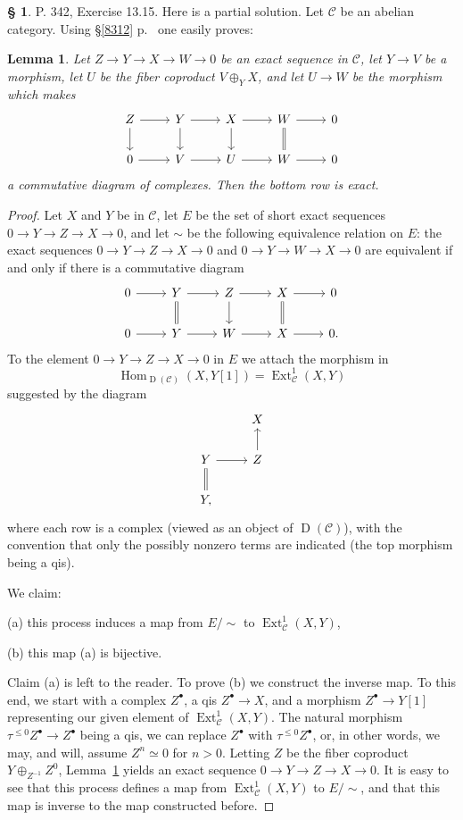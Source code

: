 \documentclass[12pt]{article}
\newtheorem{lem}[thm]{Lemma}
\theoremstyle{remark}
\theoremstyle{definition}
\newtheorem{s}[thm]{\S}
\newcommand{\C}{\mathcal C}
\newcommand{\oo}{\operatorname}
\DeclareMathOperator{\Hom}{Hom}%
\begin{document}
\begin{s} 
P. 342, Exercise 13.15. Here is a partial solution. Let $\C$ be an abelian category. Using \S\ref{8312} p.~\pageref{8312} one easily proves:

\begin{lem}\label{738}
Let $Z\to Y\to X\to W\to0$ be an exact sequence in $\C$, let $Y\to V$ be a morphism, let $U$ be the fiber coproduct $V\oplus_YX$, and let $U\to W$ be the morphism which makes 
$$
\begin{tikzcd}
Z\ar{d}\ar{r}&Y\ar{d}\ar{r}&X\ar{d}\ar{r}&W\ar[equal]{d}\ar{r}&0\\ 
0\ar{r}&V\ar{r}&U\ar{r}&W\ar{r}&0
\end{tikzcd}
$$ 
a commutative diagram of complexes. Then the bottom row is exact.
\end{lem}
%
\begin{proof}
Let $X$ and $Y$ be in $\C$, let $E$ be the set of short exact sequences $0\to Y\to Z\to X\to0$, and let $\sim$ be the following equivalence relation on $E$: the exact sequences $0\to Y\to Z\to X\to0$ and $0\to Y\to W\to X\to0$ are equivalent if and only if there is a commutative diagram 
$$
\begin{tikzcd}
0\ar{r}&Y\ar[equal]{d}\ar{r}&Z\ar{d}\ar{r}&X\ar[equal]{d}\ar{r}&0\\ 
0\ar{r}&Y\ar{r}&W\ar{r}&X\ar{r}&0.
\end{tikzcd}
$$ 
To the element $0\to Y\to Z\to X\to0$ in $E$ we attach the morphism in 
$$
\Hom_{\oo D(\C)}(X,Y[1])=\oo{Ext}^1_\C(X,Y)
$$ 
suggested by the diagram 
$$
\begin{tikzcd}
{}&X\\ 
Y\ar[equal]{d}\ar{r}&Z\ar{u}\\ 
Y,
\end{tikzcd}
$$ 
where each row is a complex (viewed as an object of $\oo D(\C)$), with the convention that only the possibly nonzero terms are indicated (the top morphism being a qis). 

We claim: 

(a) this process induces a map from $E/\!\!\sim$ to $\oo{Ext}^1_\C(X,Y)$, 

(b) this map (a) is bijective. 

Claim (a) is left to the reader. To prove (b) we construct the inverse map. To this end, we start with a complex $Z^\bullet$, a qis $Z^\bullet\to X$, and a morphism $Z^\bullet\to Y[1]$ representing our given element of $\oo{Ext}^1_\C(X,Y)$. The natural morphism $\tau^{\le0}Z^\bullet\to Z^\bullet$ being a qis, we can replace $Z^\bullet$ with $\tau^{\le0}Z^\bullet$, or, in other words, we may, and will, assume $Z^n\simeq0$ for $n>0$. Letting $Z$ be the fiber coproduct $Y\oplus_{Z^{-1}}Z^0$, Lemma~\ref{738} yields an exact sequence $0\to Y\to Z\to X\to0$. It is easy to see that this process defines a map from $\oo{Ext}^1_\C(X,Y)$ to $E/\!\!\sim$, and that this map is inverse to the map constructed before.
\end{proof}
\end{s}
\end{document}
